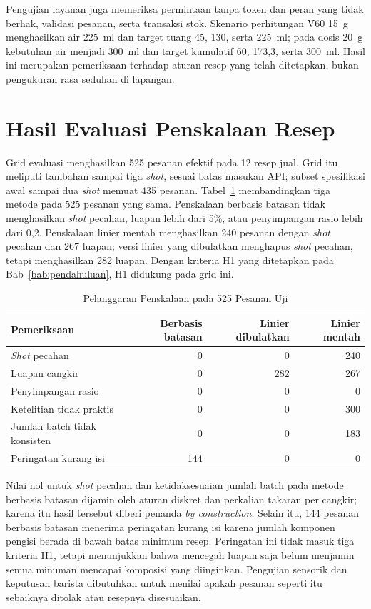 Pengujian layanan juga memeriksa permintaan tanpa token dan peran yang tidak berhak, validasi pesanan, serta transaksi stok. Skenario perhitungan V60 15~g menghasilkan air 225~ml dan target tuang 45, 130, serta 225~ml; pada dosis 20~g kebutuhan air menjadi 300~ml dan target kumulatif 60, 173,3, serta 300~ml. Hasil ini merupakan pemeriksaan terhadap aturan resep yang telah ditetapkan, bukan pengukuran rasa seduhan di lapangan.

\section{Hasil Evaluasi Penskalaan Resep}
\label{sec:hasil-penskalaan}

Grid evaluasi menghasilkan 525 pesanan efektif pada 12 resep jual. Grid itu meliputi tambahan sampai tiga \textit{shot}, sesuai batas masukan API; subset spesifikasi awal sampai dua \textit{shot} memuat 435 pesanan. Tabel~\ref{tab:hasil-penskalaan} membandingkan tiga metode pada 525 pesanan yang sama. Penskalaan berbasis batasan tidak menghasilkan \textit{shot} pecahan, luapan lebih dari 5\%, atau penyimpangan rasio lebih dari 0,2. Penskalaan linier mentah menghasilkan 240 pesanan dengan \textit{shot} pecahan dan 267 luapan; versi linier yang dibulatkan menghapus \textit{shot} pecahan, tetapi menghasilkan 282 luapan. Dengan kriteria H1 yang ditetapkan pada Bab~\ref{bab:pendahuluan}, H1 didukung pada grid ini.

\begin{table}[htbp]
\centering
\caption{Pelanggaran Penskalaan pada 525 Pesanan Uji}
\label{tab:hasil-penskalaan}
\small
\begin{tabular}{lrrr}
\toprule
Pemeriksaan & Berbasis batasan & Linier dibulatkan & Linier mentah \\
\midrule
\textit{Shot} pecahan & 0 & 0 & 240 \\
Luapan cangkir & 0 & 282 & 267 \\
Penyimpangan rasio & 0 & 0 & 0 \\
Ketelitian tidak praktis & 0 & 0 & 300 \\
Jumlah batch tidak konsisten & 0 & 0 & 183 \\
Peringatan kurang isi & 144 & 0 & 0 \\
\bottomrule
\end{tabular}
\end{table}

Nilai nol untuk \textit{shot} pecahan dan ketidaksesuaian jumlah batch pada metode berbasis batasan dijamin oleh aturan diskret dan perkalian takaran per cangkir; karena itu hasil tersebut diberi penanda \textit{by construction}. Selain itu, 144 pesanan berbasis batasan menerima peringatan kurang isi karena jumlah komponen pengisi berada di bawah batas minimum resep. Peringatan ini tidak masuk tiga kriteria H1, tetapi menunjukkan bahwa mencegah luapan saja belum menjamin semua minuman mencapai komposisi yang diinginkan. Pengujian sensorik dan keputusan barista dibutuhkan untuk menilai apakah pesanan seperti itu sebaiknya ditolak atau resepnya disesuaikan.

